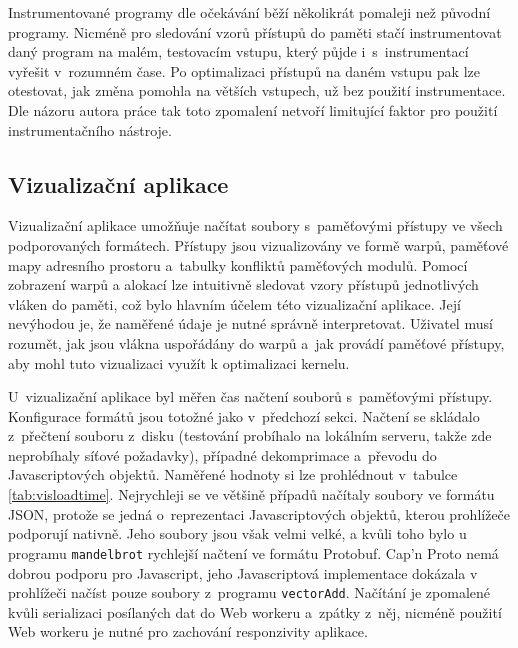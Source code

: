 Instrumentované programy dle očekávání běží několikrát pomaleji než původní programy. Nicméně pro sledování vzorů přístupů do paměti stačí instrumentovat daný program na malém, testovacím vstupu, který půjde i~s~instrumentací vyřešit v~rozumném čase. Po optimalizaci přístupů na daném vstupu pak lze otestovat, jak změna pomohla na větších vstupech, už bez použití instrumentace. Dle názoru autora práce tak toto zpomalení netvoří limitující faktor pro použití instrumentačního nástroje.

\subsection{Vizualizační aplikace}
Vizualizační aplikace umožňuje načítat soubory s~paměťovými přístupy ve všech podporovaných formátech. Přístupy jsou vizualizovány ve formě warpů, paměťové mapy adresního prostoru a~tabulky konfliktů paměťových modulů. Pomocí zobrazení warpů a alokací lze intuitivně sledovat vzory přístupů jednotlivých vláken do paměti, což bylo hlavním účelem této vizualizační aplikace.
Její nevýhodou je, že naměřené údaje je nutné správně interpretovat. Uživatel musí rozumět, jak jsou vlákna uspořádány do warpů a~jak provádí paměťové přístupy, aby mohl tuto vizualizaci využít k optimalizaci kernelu.

U~vizualizační aplikace byl měřen čas načtení souborů s~paměťovými přístupy. Konfigurace formátů jsou totožné jako v~předchozí sekci. Načtení se skládalo z~přečtení souboru z~disku (testování probíhalo na lokálním serveru, takže zde neprobíhaly síťové požadavky), případné dekomprimace a~převodu do Javascriptových objektů. Naměřené hodnoty si lze prohlédnout v~tabulce \ref{tab:visloadtime}. Nejrychleji se ve většině případů načítaly soubory ve formátu JSON, protože se jedná o~reprezentaci Javascriptových objektů, kterou prohlížeče podporují nativně. Jeho soubory jsou však velmi velké, a kvůli toho bylo u programu \texttt{mandelbrot} rychlejší načtení ve formátu Protobuf. Cap'n Proto nemá dobrou podporu pro Javascript, jeho Javascriptová implementace dokázala v prohlížeči načíst pouze soubory z~programu \texttt{vectorAdd}.
Načítání je zpomalené kvůli serializaci posílaných dat do Web workeru a~zpátky z~něj, nicméně použití Web workeru je nutné pro zachování responzivity aplikace.

